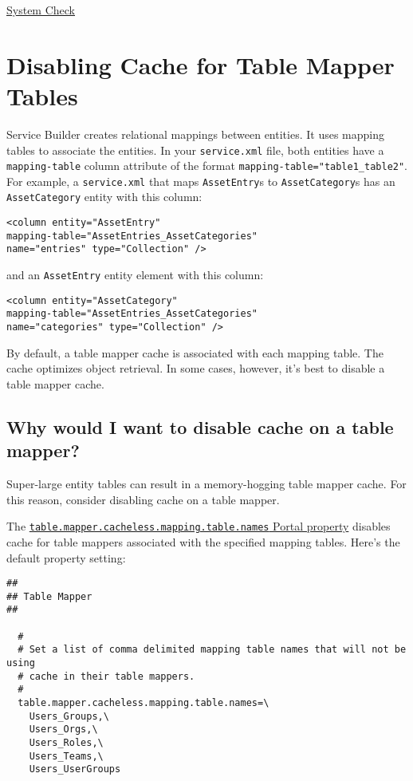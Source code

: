 \href{/docs/7-2/appdev/-/knowledge_base/a/system-check}{System Check}

\chapter{Disabling Cache for Table Mapper
Tables}\label{disabling-cache-for-table-mapper-tables}

Service Builder creates relational mappings between entities. It uses
mapping tables to associate the entities. In your \texttt{service.xml}
file, both entities have a \texttt{mapping-table} column attribute of
the format \texttt{mapping-table="table1\_table2"}. For example, a
\texttt{service.xml} that maps \texttt{AssetEntry}s to
\texttt{AssetCategory}s has an \texttt{AssetCategory} entity with this
column:

\begin{verbatim}
<column entity="AssetEntry" 
mapping-table="AssetEntries_AssetCategories" 
name="entries" type="Collection" />
\end{verbatim}

and an \texttt{AssetEntry} entity element with this column:

\begin{verbatim}
<column entity="AssetCategory" 
mapping-table="AssetEntries_AssetCategories" 
name="categories" type="Collection" />
\end{verbatim}

By default, a table mapper cache is associated with each mapping table.
The cache optimizes object retrieval. In some cases, however, it's best
to disable a table mapper cache.

\section{Why would I want to disable cache on a table
mapper?}\label{why-would-i-want-to-disable-cache-on-a-table-mapper}

Super-large entity tables can result in a memory-hogging table mapper
cache. For this reason, consider disabling cache on a table mapper.

The
\href{https://docs.liferay.com/dxp/portal/7.2-latest/propertiesdoc/portal.properties.html\#Table\%20Mapper}{\texttt{table.mapper.cacheless.mapping.table.names}
Portal property} disables cache for table mappers associated with the
specified mapping tables. Here's the default property setting:

\begin{verbatim}
##
## Table Mapper
##

  #
  # Set a list of comma delimited mapping table names that will not be using
  # cache in their table mappers.
  #
  table.mapper.cacheless.mapping.table.names=\
    Users_Groups,\
    Users_Orgs,\
    Users_Roles,\
    Users_Teams,\
    Users_UserGroups
\end{verbatim}

